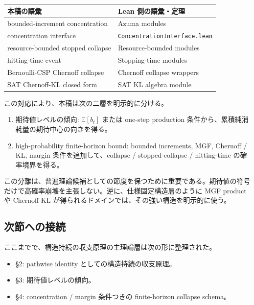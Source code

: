 \documentclass[12pt,a4paper]{article}
\begin{document}
{\def\LTcaptype{table} %
\begin{longtable}[]{@{}ll@{}}
\toprule\noalign{}
本稿の語彙 & Lean 側の語彙・定理 \\
\midrule\noalign{}
\endhead
\bottomrule\noalign{}
\endlastfoot
bounded-increment concentration & Azuma modules \\
concentration interface & \texttt{ConcentrationInterface.lean} \\
resource-bounded stopped collapse & Resource-bounded modules \\
hitting-time event & Stopping-time modules \\
Bernoulli-CSP Chernoff collapse & Chernoff collapse wrappers \\
SAT Chernoff-KL closed form & SAT KL algebra module \\
\end{longtable}
}

この対応により、本稿は次の二層を明示的に分ける。

\begin{enumerate}
\def\labelenumi{\arabic{enumi}.}
\tightlist
\item
  期待値レベルの傾向: \(\mathbb E[b_{t}]\) または one-step production 条件から、累積純消耗量の期待中心の向きを得る。
\item
  high-probability finite-horizon bound: bounded increments, MGF, Chernoff / KL, margin 条件を追加して、collapse / stopped-collapse / hitting-time の確率境界を得る。
\end{enumerate}

この分離は、普遍理論候補としての節度を保つために重要である。期待値の符号だけで高確率崩壊を主張しない。逆に、仕様固定構造層のように MGF product や Chernoff-KL が得られるドメインでは、その強い構造を明示的に使う。

\subsection{次節への接続}\label{ux6b21ux7bc0ux3078ux306eux63a5ux7d9a-1}

ここまでで、構造持続の収支原理の主理論層は次の形に整理された。

\begin{itemize}
\tightlist
\item
  §2: pathwise identity としての構造持続の収支原理。
\item
  §3: 期待値レベルの傾向。
\item
  §4: concentration / margin 条件つきの finite-horizon collapse schema。
\end{itemize}
\end{document}

